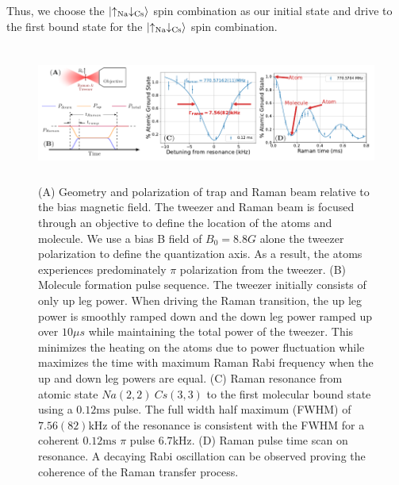 \documentclass[aps,prl,twocolumn,superscriptaddress]{revtex4-1}
\begin{document}
Thus, we choose the $\ket{\uparrow_{\text{Na}} \downarrow_{\text{Cs}}}$ spin combination as our initial state and drive to the first bound state for the $\ket{\uparrow_{\text{Na}} \downarrow_{\text{Cs}}}$ spin combination. %

\begin{figure}[ht!]
  \includegraphics[height=4.5cm]{fig2.pdf}
  \caption{
    (A) Geometry and polarization of trap and Raman beam relative to the bias magnetic field.
    The tweezer and Raman beam is focused through an objective to define the location of the
    atoms and molecule.
    We use a bias B field of $B_0=8.8 G$ alone the tweezer polarization
    to define the quantization axis.
    As a result, the atoms experiences predominately $\pi$ polarization from the tweezer.
    (B) Molecule formation pulse sequence. The tweezer initially consists of only up leg power.
    When driving the Raman transition, the up leg power is smoothly ramped down and
    the down leg power ramped up over $10\mu s$ while maintaining the total power of the tweezer.
    This minimizes the heating on the atoms due to power fluctuation while maximizes the time
    with maximum Raman Rabi frequency when the up and down leg powers are equal.
    (C) Raman resonance from atomic state $Na(2,2)\ Cs(3,3)$ to the first molecular bound state
    using a $0.12\mathrm{ms}$ pulse.
    The full width half maximum (FWHM) of $7.56(82) \mathrm{kHz}$ of the resonance
    is consistent with the FWHM for a coherent $0.12\mathrm{ms}$ $\pi$ pulse $6.7 \mathrm{kHz}$.
    (D) Raman pulse time scan on resonance. A decaying Rabi oscillation can be observed
    proving the coherence of the Raman transfer process.
    \label{f-raman}}
\end{figure}
\end{document}
